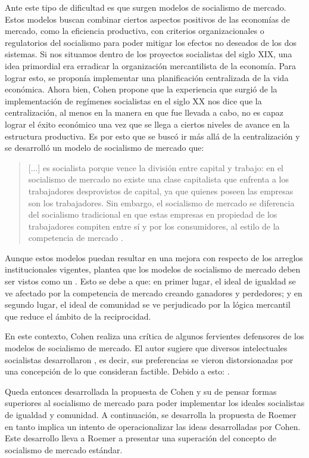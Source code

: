 Ante este tipo de dificultad es que surgen modelos de socialismo de mercado. Estos modelos buscan combinar ciertos aspectos positivos de las economías de mercado, como la eficiencia productiva, con criterios organizacionales o regulatorios del socialismo para poder mitigar los efectos no deseados de los dos sistemas. Si nos situamos dentro de los proyectos socialistas del siglo XIX, una idea primordial era erradicar la organización mercantilista de la economía. Para lograr esto, se proponía implementar una planificación centralizada de la vida económica. Ahora bien, Cohen propone que la experiencia que surgió de la implementación de regímenes socialistas en el siglo XX nos dice que la centralización, al menos en la manera en que fue llevada a cabo, no es capaz lograr el éxito económico una vez que se llega a ciertos niveles de avance en la estructura productiva. Es por esto que se buscó ir más allá de la centralización y se desarrolló un modelo de socialismo de mercado que:

\vspace{3mm}
\begin{quote}
    [...] es socialista porque vence la división entre capital y trabajo: en el socialismo de mercado no existe una clase capitalista que enfrenta a los trabajadores desprovistos de capital, ya que quienes poseen las empresas son los trabajadores. Sin embargo, el socialismo de mercado se diferencia del socialismo tradicional en que estas empresas en propiedad de los trabajadores compiten entre sí y por los consumidores, al estilo de la competencia de mercado \citep[p. 204]{Cohen_2014c}.
\end{quote}
\vspace{3mm}

Aunque estos modelos puedan resultar en una mejora con respecto de los arreglos institucionales vigentes, \citet{Cohen_2014c} plantea que los modelos de socialismo de mercado deben ser vistos como un . Esto se debe a que: en primer lugar, el ideal de igualdad se ve afectado por la competencia de mercado creando ganadores y perdedores; y en segundo lugar, el ideal de comunidad se ve perjudicado por la lógica mercantil que reduce el ámbito de la reciprocidad.

En este contexto, Cohen realiza una crítica de algunos fervientes defensores de los modelos de socialismo de mercado. El autor sugiere que diversos intelectuales socialistas desarrollaron , es decir, sus preferencias se vieron distorsionadas por una concepción de lo que consideran factible. Debido a esto:  \citep[p. 205]{Cohen_2014c}.

Queda entonces desarrollada la propuesta de Cohen y su  de pensar formas superiores al socialismo de mercado para poder implementar los ideales socialistas de igualdad y comunidad. A continuación, se desarrolla la propuesta de Roemer en tanto implica un intento de operacionalizar las ideas desarrolladas por Cohen. Este desarrollo lleva a Roemer a presentar una superación del concepto de socialismo de mercado estándar.




